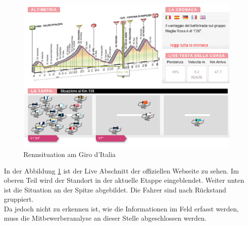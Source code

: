 \begin{figure}[h!]
\caption{Rennsituation am Giro d'Italia}
\label{fig:giro}
\includegraphics[scale=0.7]{05bericht/images/giro.png}
\end{figure} 

In der Abbildung \ref{fig:giro} ist der Live Abschnitt der offiziellen Webseite zu sehen. Im oberen Teil wird der Standort in der aktuelle Etappe eingeblendet. Weiter unten ist die Situation an der Spitze abgebildet. Die Fahrer sind nach Rückstand gruppiert.
\\
Da jedoch nicht zu erkennen ist, wie die Informationen im Feld erfasst werden, muss die Mitbewerberanalyse an dieser Stelle abgeschlossen werden.